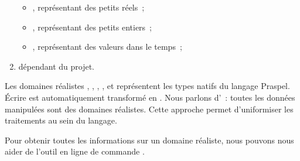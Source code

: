 \begin{enumerate}[couche 1]
\begin{itemize}
    \item {}, représentant des petits réels~;

    \item {}, représentant des petits entiers~;

    \item {}, représentant des valeurs dans le temps~;

    \end{itemize}

\item dépendant du projet.

\end{enumerate}
%
Les domaines réalistes , ,
, ,  et
 représentent les types natifs du langage Praspel. Écrire
 est automatiquement transformé en . Nous
parlons d'~: toutes les données manipulées sont des
domaines réalistes. Cette approche permet d'uniformiser les traitements au sein
du langage.

Pour obtenir toutes les informations sur un domaine réaliste, nous pouvons nous
aider de l'outil en ligne de commande .

